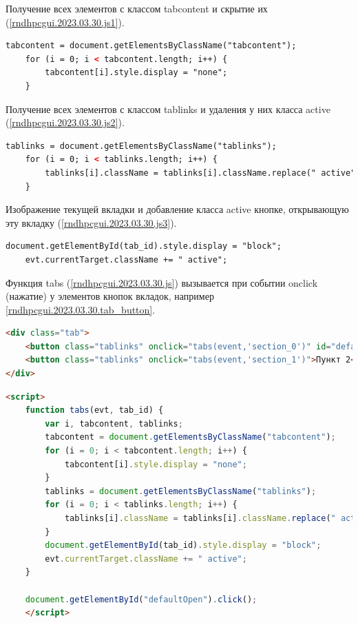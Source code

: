 Получение всех элементов с классом \textsf{tabcontent} и скрытие их (\ref{rndhpcgui.2023.03.30.js1}).

\begin{lstlisting}[frame=single, label={rndhpcgui.2023.03.30.js1}, caption={JavaScript код скрытия вкладок}, language={HTML}]
    tabcontent = document.getElementsByClassName("tabcontent");
    for (i = 0; i < tabcontent.length; i++) {
        tabcontent[i].style.display = "none";
    }
\end{lstlisting}


Получение всех элементов с классом \textsf{tablinks} и удаления у них класса \textsf{active} (\ref{rndhpcgui.2023.03.30.js2}).

\begin{lstlisting}[frame=single, label={rndhpcgui.2023.03.30.js2}, caption={JavaScript код удаления класса \textsf{active}}, language={HTML}]
    tablinks = document.getElementsByClassName("tablinks");
    for (i = 0; i < tablinks.length; i++) {
        tablinks[i].className = tablinks[i].className.replace(" active", "");
    }
\end{lstlisting}

Изображение текущей вкладки и добавление класса \textsf{active} кнопке, открывающую эту вкладку (\ref{rndhpcgui.2023.03.30.js3}).

\begin{lstlisting}[frame=single, label={rndhpcgui.2023.03.30.js3}, caption={JavaScript код изображения текущей вкладки}, language={HTML}]
    document.getElementById(tab_id).style.display = "block";
    evt.currentTarget.className += " active";
\end{lstlisting}


Функция \textsf{tabs} (\ref{rndhpcgui.2023.03.30.js}) вызывается при событии \textsf{onclick} (нажатие) у элементов кнопок вкладок, например \ref{rndhpcgui.2023.03.30.tab_button}.

\begin{lstlisting}[frame=single, label={rndhpcgui.2023.03.30.tab_button}, caption={Элементы кнопок вкладок}, language={HTML}] 
<div class="tab">
	<button class="tablinks" onclick="tabs(event,'section_0')" id="defaultOpen">Пункт 1</button>
	<button class="tablinks" onclick="tabs(event,'section_1')">Пункт 2</button>
</div>
\end{lstlisting}


\begin{lstlisting}[frame=single, label={rndhpcgui.2023.03.30.js}, caption={полный JavaScript код}, language={HTML}] 
    <script>
    function tabs(evt, tab_id) {
        var i, tabcontent, tablinks;
        tabcontent = document.getElementsByClassName("tabcontent");
        for (i = 0; i < tabcontent.length; i++) {
            tabcontent[i].style.display = "none";
        }
        tablinks = document.getElementsByClassName("tablinks");
        for (i = 0; i < tablinks.length; i++) {
            tablinks[i].className = tablinks[i].className.replace(" active", "");
        }
        document.getElementById(tab_id).style.display = "block";
        evt.currentTarget.className += " active";
    }
    
    document.getElementById("defaultOpen").click();
    </script>
\end{lstlisting}

